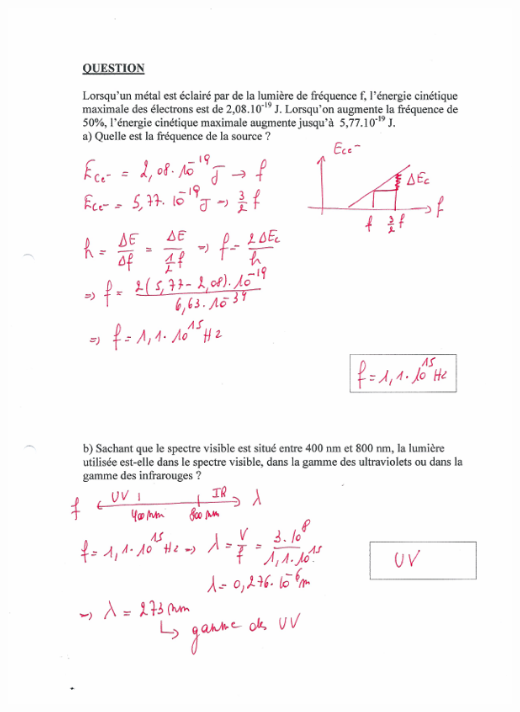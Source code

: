 {\includegraphics[width=17.498cm,height=24.13cm]{Pictures/10000001000002570000033BF05D77DDF7E1650A.png}

}

